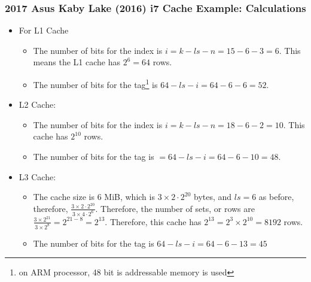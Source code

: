 \begin{frame}\frametitle{2017 Asus Kaby Lake (2016) i7 Cache Example: Calculations}
\begin{itemize}
    \item For L1 Cache
    \begin{itemize}
        \item The number of bits for the index is $i=k-ls-n=15-6-3=6$. This means the L1 cache has $2^6=64$ rows.
\item The number of bits for the tag\footnote{on ARM processor, 48 bit is addressable memory is used} is $64-ls-i=64-6-6=52$.
    \end{itemize}
    \item L2 Cache:
    \begin{itemize}
        \item The number of bits for the index is $i=k-ls-n=18-6-2=10$. This cache has $2^{10}$ rows.
        \item The number of bits for the tag is $=64-ls-i=64-6-10=48$.
    \end{itemize}
    \item L3 Cache:
    \begin{itemize}
        \item The cache size is 6 MiB, which is $3 \times 2 \cdot 2^{20}$ bytes, and $ls=6$ as before, therefore, $\frac{3 \times 2 \cdot 2^{20}}{3 \times 4 \cdot 2^{6}}$. Therefore, the number of sets, or rows are $\frac{3 \times 2^{21}}{3 \times 2^{8}} = 2^{21-8} = 2^{13}$. Therefore, this cache has $2^{13} = 2^3 \times 2^{10} = 8192$ rows. 
        \item The number of bits for the tag is $64-ls-i=64-6-13=45 $
    \end{itemize}
\end{itemize}
\end{frame}




